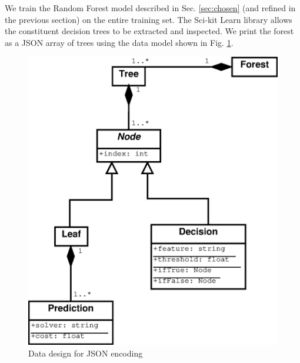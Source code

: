 We train the Random Forest model described in Sec. \ref{sec:chosen} (and refined in the previous section) on the entire training set.
The Sci-kit Learn library allows the constituent decision trees to be extracted and inspected.
We print the forest as a JSON array of trees using the data model shown in Fig. \ref{fig:json}. 

\begin{figure}
\centering
\includegraphics[width=0.8\linewidth]{Figures/data}
\caption[Data design for JSON encoding]{Data design for JSON encoding}
\label{fig:json}
\end{figure}
%
%

